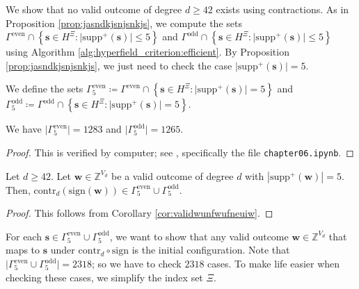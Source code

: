 We show that no valid outcome of degree \( d \geq 42 \) exists using contractions. As in Proposition \ref{prop:jasndkjsnjsnkjs}, we compute the sets \(  \Gamma^{\mathrm{even}} \cap \left\{ \mathbf{s} \in H^{\Xi} : \lvert \mathrm{supp}^+(\mathbf{s}) \rvert \leq 5 \right\} \) and \( \Gamma^{\mathrm{odd}} \cap \left\{ \mathbf{s} \in H^{\Xi} : \lvert \mathrm{supp}^+(\mathbf{s}) \rvert \leq 5 \right\}  \)
using Algorithm \ref{alg:hyperfield_criterion:efficient}. By Proposition \ref{prop:jasndkjsnjsnkjs}, we just need to check the case \( \lvert \mathrm{supp}^+(\mathbf{s}) \rvert = 5 \).



\begin{definition}
    We define the sets \( \Gamma^{\mathrm{even}}_5 \coloneqq \Gamma^{\mathrm{even}} \cap \left\{ \mathbf{s} \in H^{\Xi} : \lvert \mathrm{supp}^+(\mathbf{s}) \rvert = 5 \right\} \) and \( \Gamma^{\mathrm{odd}}_5 \coloneqq \Gamma^{\mathrm{odd}} \cap \left\{ \mathbf{s} \in H^{\Xi} : \lvert \mathrm{supp}^+(\mathbf{s}) \rvert = 5 \right\} \).
\end{definition}

\begin{proposition}
    We have \( \lvert \Gamma^{\mathrm{even}}_5 \rvert  = 1283\) and \( \lvert \Gamma^{\mathrm{odd}}_5 \rvert  = 1265\).
\end{proposition}

\begin{proof}
    This is verified by computer; see \cite{ducrepo}, specifically the file \texttt{chapter06.ipynb}.
\end{proof}

\begin{corollary}
    Let \( d\geq 42 \). Let \( \mathbf{w} \in \mathbb{Z}^{V_d} \) be a valid outcome of degree \( d \) with \( |\mathrm{supp}^+(\mathbf w)| = 5 \). Then, \( \mathrm{contr}_d(\mathrm{sign}(\mathbf{w})) \in \Gamma^{\mathrm{even}}_5 \cup \Gamma^{\mathrm{odd}}_5 \).
\end{corollary}

\begin{proof}
    This follows from Corollary \ref{cor:validwunfwufneuiw}.
\end{proof}

For each \( \mathbf{s} \in \Gamma^{\mathrm{even}}_5 \cup \Gamma^{\mathrm{odd}}_5 \), we want to show that any valid outcome \( \mathbf{w} \in \mathbb{Z}^{V_d} \) that maps to \( \mathbf{s} \) under \( \mathrm{contr}_d \circ \mathrm{sign} \) is the initial configuration. Note that \( \lvert \Gamma^{\mathrm{even}}_5 \cup \Gamma^{\mathrm{odd}}_5 \rvert = 2318 \); so we have to check \( 2318 \) cases. To make life easier when checking these cases, we simplify the index set \( \Xi \).

